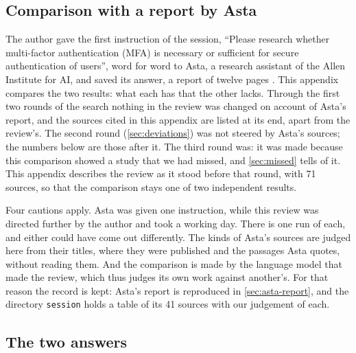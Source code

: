 \begin{refsection}
\section{Comparison with a report by Asta}\label{sec:asta}

The author gave the first instruction of the session, \enquote{Please
research whether multi-factor authentication (MFA) is necessary or
sufficient for secure authentication of users}, word for word to Asta,
a research assistant of the Allen Institute for AI, and saved its
answer, a report of twelve pages \autocite{Asta2026Report}.
This appendix compares the two results: what each has that the other
lacks.
Through the first two rounds of the search nothing in the review was
changed on account of Asta's report, and the sources cited in this
appendix are listed at its end, apart from the review's.
The second round (\cref{sec:deviations}) was not steered by Asta's
sources; the numbers below are those after it.
The third round was: it was made because this comparison showed a
study that we had missed, and \cref{sec:missed} tells of it.
This appendix describes the review as it stood before that round, with
71 sources, so that the comparison stays one of two independent
results.

Four cautions apply.
Asta was given one instruction, while this review was directed further
by the author and took a working day.
There is one run of each, and either could have come out differently.
The kinds of Asta's sources are judged here from their titles, where
they were published and the passages Asta quotes, without reading them.
And the comparison is made by the language model that made the review,
which thus judges its own work against another's.
For that reason the record is kept: Asta's report is reproduced in
\cref{sec:asta-report}, and the directory \texttt{session} holds a
table of its 41 sources with our judgement of each.

\subsection{The two answers}


\end{refsection}
